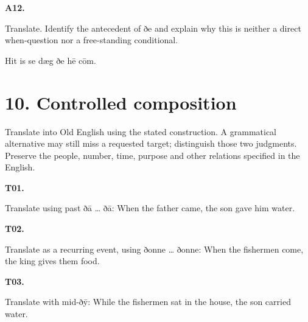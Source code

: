 \par\begin{minipage}{\linewidth}\raggedright
\textbf{A12.}

Translate. Identify the antecedent of ðe and explain why this is neither a direct when-question nor a free-standing conditional.

Hit is se dæg ðe hē cōm.

\end{minipage}\par\addvspace{4pt}

\section*{10. Controlled composition}

Translate into Old English using the stated construction. A grammatical alternative may still miss a requested target; distinguish those two judgments. Preserve the people, number, time, purpose and other relations specified in the English.

\par\begin{minipage}{\linewidth}\raggedright
\textbf{T01.}

Translate using past ðā … ðā: When the father came, the son gave him water.

\end{minipage}\par\addvspace{4pt}

\par\begin{minipage}{\linewidth}\raggedright
\textbf{T02.}

Translate as a recurring event, using ðonne … ðonne: When the fishermen come, the king gives them food.

\end{minipage}\par\addvspace{4pt}

\par\begin{minipage}{\linewidth}\raggedright
\textbf{T03.}

Translate with mid-ðȳ: While the fishermen sat in the house, the son carried water.

\end{minipage}\par\addvspace{4pt}

